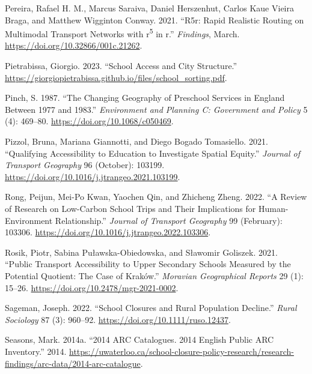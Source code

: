 \documentclass[
default
]{sn-jnl}
\newlength{\cslhangindent}
\newenvironment{CSLReferences}[2] %
 {\begin{list}{}{%
  \setlength{\itemindent}{0pt}
  \setlength{\leftmargin}{0pt}
  \setlength{\parsep}{0pt}
  \ifodd #1
   \setlength{\leftmargin}{\cslhangindent}
   \setlength{\itemindent}{-1\cslhangindent}
  \fi
  \setlength{\itemsep}{#2\baselineskip}}}
 {\end{list}}
\begin{document}
\begin{CSLReferences}{1}{0}
Pereira, Rafael H. M., Marcus Saraiva, Daniel Herszenhut, Carlos Kaue
Vieira Braga, and Matthew Wigginton Conway. 2021. {``R5r: Rapid
Realistic Routing on Multimodal Transport Networks with
r\textsuperscript{5} in r.''} \emph{Findings}, March.
\url{https://doi.org/10.32866/001c.21262}.

Pietrabissa, Giorgio. 2023. {``School Access and City Structure.''}
\url{https://giorgiopietrabissa.github.io/files/school_sorting.pdf}.

Pinch, S. 1987. {``The Changing Geography of Preschool Services in
England Between 1977 and 1983.''} \emph{Environment and Planning C:
Government and Policy} 5 (4): 469--80.
\url{https://doi.org/10.1068/c050469}.

Pizzol, Bruna, Mariana Giannotti, and Diego Bogado Tomasiello. 2021.
{``Qualifying Accessibility to Education to Investigate Spatial
Equity.''} \emph{Journal of Transport Geography} 96 (October): 103199.
\url{https://doi.org/10.1016/j.jtrangeo.2021.103199}.

Rong, Peijun, Mei-Po Kwan, Yaochen Qin, and Zhicheng Zheng. 2022. {``A
Review of Research on Low-Carbon School Trips and Their Implications for
Human-Environment Relationship.''} \emph{Journal of Transport Geography}
99 (February): 103306.
\url{https://doi.org/10.1016/j.jtrangeo.2022.103306}.

Rosik, Piotr, Sabina Puławska-Obiedowska, and Sławomir Goliszek. 2021.
{``Public Transport Accessibility to Upper Secondary Schools Measured by
the Potential Quotient: The Case of Kraków.''} \emph{Moravian
Geographical Reports} 29 (1): 15--26.
\url{https://doi.org/10.2478/mgr-2021-0002}.

Sageman, Joseph. 2022. {``School Closures and Rural Population
Decline.''} \emph{Rural Sociology} 87 (3): 960--92.
\url{https://doi.org/10.1111/ruso.12437}.

Seasons, Mark. 2014a. {``2014 {ARC} Catalogues. 2014 English Public
{ARC} Inventory.''} 2014.
\url{https://uwaterloo.ca/school-closure-policy-research/research-findings/arc-data/2014-arc-catalogue}.


\end{CSLReferences}
\end{document}
